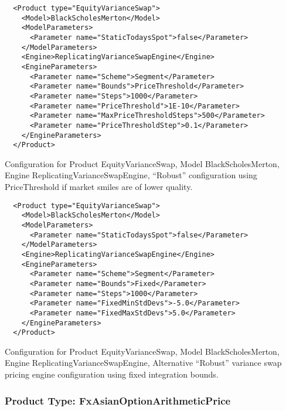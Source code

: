 \begin{listing}[ht]
\begin{verbatim}
  <Product type="EquityVarianceSwap">
    <Model>BlackScholesMerton</Model>
    <ModelParameters>
      <Parameter name="StaticTodaysSpot">false</Parameter>
    </ModelParameters>
    <Engine>ReplicatingVarianceSwapEngine</Engine>
    <EngineParameters>
      <Parameter name="Scheme">Segment</Parameter>
      <Parameter name="Bounds">PriceThreshold</Parameter>
      <Parameter name="Steps">1000</Parameter>
      <Parameter name="PriceThreshold">1E-10</Parameter>
      <Parameter name="MaxPriceThresholdSteps">500</Parameter>
      <Parameter name="PriceThresholdStep">0.1</Parameter>
    </EngineParameters>
  </Product>
\end{verbatim}
\caption{Configuration for Product EquityVarianceSwap, Model BlackScholesMerton, Engine ReplicatingVarianceSwapEngine,
  ``Robust'' configuration using PriceThreshold if market smiles are of lower quality.}
\label{lst:peconfig_EquityVarianceSwap_BlackScholesMerton_ReplicatingVarianceSwapEngine_1}
\end{listing}

\begin{listing}[ht]
\begin{verbatim}
  <Product type="EquityVarianceSwap">
    <Model>BlackScholesMerton</Model>
    <ModelParameters>
      <Parameter name="StaticTodaysSpot">false</Parameter>
    </ModelParameters>
    <Engine>ReplicatingVarianceSwapEngine</Engine>
    <EngineParameters>
      <Parameter name="Scheme">Segment</Parameter>
      <Parameter name="Bounds">Fixed</Parameter>
      <Parameter name="Steps">1000</Parameter>
      <Parameter name="FixedMinStdDevs">-5.0</Parameter>
      <Parameter name="FixedMaxStdDevs">5.0</Parameter>
    </EngineParameters>
  </Product>
\end{verbatim}
\caption{Configuration for Product EquityVarianceSwap, Model BlackScholesMerton, Engine ReplicatingVarianceSwapEngine,
  Alternative ``Robust'' variance swap pricing engine configuration using fixed integration bounds.}
\label{lst:peconfig_EquityVarianceSwap_BlackScholesMerton_ReplicatingVarianceSwapEngine_2}
\end{listing}

\subsubsection{Product Type: FxAsianOptionArithmeticPrice}

